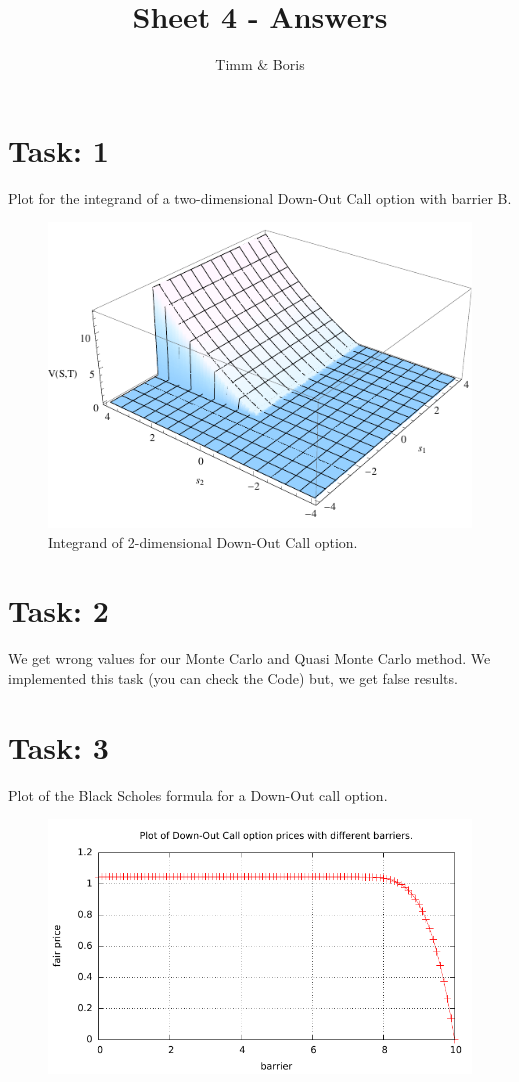 \documentclass{article}
\title{Sheet 4 - Answers}
\author{Timm \& Boris}
\begin{document}
\maketitle

\section*{Task: 1}
Plot for the integrand of a two-dimensional Down-Out Call option with barrier B.
\begin{figure}[htbp]
  \centering
     \includegraphics[width=1.0\textwidth]{../Task01/task01_plot.pdf}
  \caption*{Integrand of 2-dimensional Down-Out Call option.}
\end{figure}

\section*{Task: 2}
We get wrong values for our Monte Carlo and Quasi Monte Carlo method. We implemented this task (you can check the Code) but, we get false results.

\newpage

\section*{Task: 3}
Plot of the Black Scholes formula for a Down-Out call option.
\begin{figure}[htbp]
  \centering
     \includegraphics[width=1.0\textwidth]{../Task03/sh4_task3_price_plot.pdf}
\end{figure}
\end{document}
